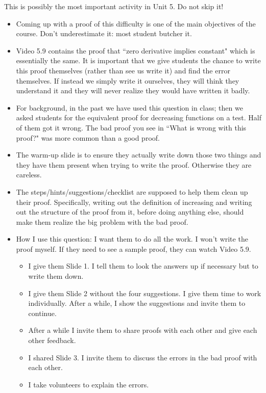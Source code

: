 \documentclass[11pt]{article}
\newcommand{\nl}{\hfill \vspace{-1.1\baselineskip}} %
\begin{document}
\begin{warning}
This is possibly the most important activity in Unit 5.  Do not skip it!
\end{warning}
\begin{comments}
\nl
\begin{itemize}
	\item   Coming up with a proof of this difficulty is one of the main objectives of the course.  Don't underestimate it: most student butcher it.
	\item Video 5.9 contains the proof that ``zero derivative implies constant" which is essentially the same.  It is important that we give students the chance to write this proof themselves (rather than see us write it) and find the error themselves.   If instead we simply write it ourselves, they will think they understand it and they will never realize they would have written it badly.
	
	\item For background, in the past we have used this question in class; then we asked students for the equivalent proof for decreasing functions on a test.  Half of them got it wrong.  The bad proof you see in ``What is wrong with this proof?" was more common than a good proof.

	\item The warm-up slide is to ensure they actually write down those two things and they have them present when trying to write the proof.  Otherwise they are careless.
		
	\item The steps/hints/suggestions/checklist are supposed to help them clean up their proof.  Specifically, writing out the definition of increasing and writing out the structure of the proof from it, before doing anything else, should make them realize the big problem with the bad proof.

	\item How I use this question:  I want them to do all the work. I won't write the proof myself.  If they need to see a sample proof, they can watch Video 5.9.
		\begin{itemize}
			\item I give them Slide 1. I tell them to look the answers up if necessary but to write them down.
			\item I give them Slide 2 without the four suggestions.  I give them time to work individually.  After a while, I show the suggestions and invite them to continue.
			\item After a while I invite them to share proofs with each other and give each other feedback.
			\item I shared Slide 3. I invite them to discuss the errors in the bad proof with each other. 
			\item I take volunteers to explain the errors.
		\end{itemize}

\end{itemize}	
\end{comments}
\end{document}
